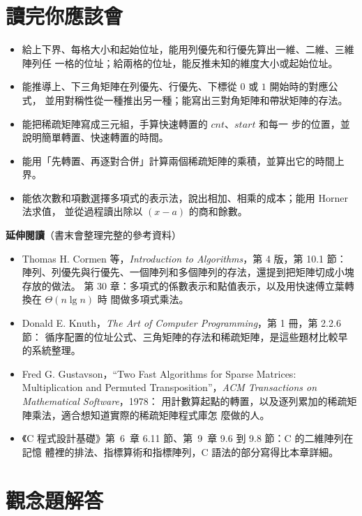 \section{讀完你應該會}
\label{sec:arr-checklist}

\begin{itemize}
\item 給上下界、每格大小和起始位址，能用列優先和行優先算出一維、二維、三維陣列任
一格的位址；給兩格的位址，能反推未知的維度大小或起始位址。
\item 能推導上、下三角矩陣在列優先、行優先、下標從 $0$ 或 $1$ 開始時的對應公式，
並用對稱性從一種推出另一種；能寫出三對角矩陣和帶狀矩陣的存法。
\item 能把稀疏矩陣寫成三元組，手算快速轉置的 $\mathit{cnt}$、$\mathit{start}$ 和每一
步的位置，並說明簡單轉置、快速轉置的時間。
\item 能用「先轉置、再逐對合併」計算兩個稀疏矩陣的乘積，並算出它的時間上界。
\item 能依次數和項數選擇多項式的表示法，說出相加、相乘的成本；能用 Horner 法求值，
並從過程讀出除以 $(x - a)$ 的商和餘數。
\end{itemize}

\textbf{延伸閱讀}（書末會整理完整的參考資料）

\begin{itemize}
\item Thomas H. Cormen 等，\textit{Introduction to Algorithms}，第 4 版，第 10.1 節：
陣列、列優先與行優先、一個陣列和多個陣列的存法，還提到把矩陣切成小塊存放的做法。
第 30 章：多項式的係數表示和點值表示，以及用快速傅立葉轉換在 $\Theta(n \lg n)$ 時
間做多項式乘法。
\item Donald E. Knuth，\textit{The Art of Computer Programming}，第 1 冊，第 2.2.6 節：
循序配置的位址公式、三角矩陣的存法和稀疏矩陣，是這些題材比較早的系統整理。
\item Fred G. Gustavson，``Two Fast Algorithms for Sparse Matrices: Multiplication and
Permuted Transposition''，\textit{ACM Transactions on Mathematical Software}，1978：
用計數算起點的轉置，以及逐列累加的稀疏矩陣乘法，適合想知道實際的稀疏矩陣程式庫怎
麼做的人。
\item 《C 程式設計基礎》第~6~章 6.11 節、第~9~章 9.6 到 9.8 節：C 的二維陣列在記憶
體裡的排法、指標算術和指標陣列，C 語法的部分寫得比本章詳細。
\end{itemize}

\section*{觀念題解答}

